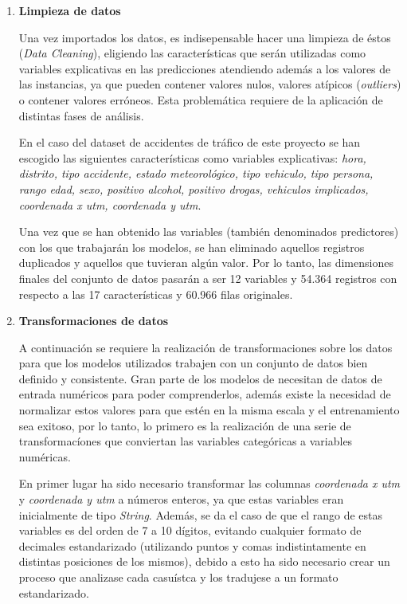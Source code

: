             \begin{enumerate}

                \item \textbf{Limpieza de datos}

                    Una vez importados los datos, es indisepensable hacer una limpieza de éstos (\textit{Data Cleaning}), eligiendo las características que serán utilizadas como variables explicativas en las predicciones atendiendo además a los valores de las instancias, ya que pueden contener valores nulos, valores atípicos (\textit{outliers}) o contener valores erróneos. Esta problemática requiere de la aplicación de distintas fases de análisis.

                    En el caso del dataset de accidentes de tráfico de este proyecto se han escogido las siguientes características como variables explicativas: \textit{hora, distrito, tipo accidente, estado meteorológico, tipo vehiculo, tipo persona, rango edad, sexo, positivo alcohol, positivo drogas, vehiculos implicados, coordenada x utm, coordenada y utm}.


                    Una vez que se han obtenido las variables (también denominados predictores) con los que trabajarán los modelos, se han eliminado aquellos registros duplicados y aquellos que tuvieran algún valor. Por lo tanto, las dimensiones finales del conjunto de datos pasarán a ser 12 variables y 54.364 registros con respecto a las 17 características y 60.966 filas originales. 

                \item \textbf{Transformaciones de datos}

                    A continuación se requiere la realización de transformaciones sobre los datos para que los modelos utilizados trabajen con un conjunto de datos bien definido y consistente. Gran parte de los modelos de  necesitan de datos de entrada numéricos para poder comprenderlos, además existe la necesidad de normalizar estos valores para que estén en la misma escala y el entrenamiento sea exitoso, por lo tanto, lo primero es la realización de una serie de transformacíones que conviertan las variables categóricas a variables numéricas.

                    En primer lugar ha sido necesario transformar las columnas \textit{coordenada x utm} y \textit{coordenada y utm} a números enteros, ya que estas variables eran inicialmente de tipo \textit{String}. Además, se da el caso de que el rango de estas variables es del orden de 7 a 10 dígitos, evitando cualquier formato de decimales estandarizado (utilizando puntos y comas indistintamente en distintas posiciones de los mismos), debido a esto ha sido necesario crear un proceso que analizase cada casuístca y los tradujese a un formato estandarizado.


\end{enumerate}
